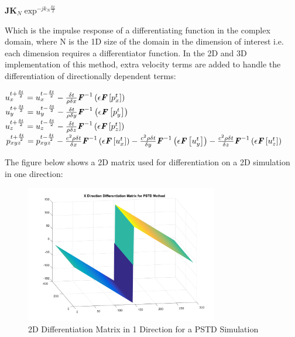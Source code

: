 \begin{center}
$\textbf{JK}_N \exp^{-jk_N\frac{\delta x}{2}}$\\
\end{center}
Which is the impulse response of a differentiating function in the complex domain, where N is the 1D size of the domain in the dimension of interest i.e. each dimension requires a differentiator function. In the 2D and 3D implementation of this method, extra velocity terms are added to handle the differentiation of directionally dependent terms:\\
\begin{center}
$u^{t + \frac{\delta t}{2}}_{x} = u^{t - \frac{\delta t}{2}}_{x} - \frac{\delta t}{\rho \delta x} \textbf{\textit{F}}^{-1}\left(\epsilon \textbf{\textit{F}}\left[p^{t}_{x}\right] \right)$\\
$u^{t + \frac{\delta t}{2}}_{y} = u^{t - \frac{\delta t}{2}}_{y} - \frac{\delta t}{\rho \delta y} \textbf{\textit{F}}^{-1}\left(\epsilon \textbf{\textit{F}}\left[p^{t}_{y}\right] \right)$\\
$u^{t + \frac{\delta t}{2}}_{z} = u^{t - \frac{\delta t}{2}}_{z} - \frac{\delta t}{\rho \delta z} \textbf{\textit{F}}^{-1}\left(\epsilon \textbf{\textit{F}}\left[p^{t}_{z}\right] \right)$\\
$p^{t + \frac{\delta t}{2}}_{xyz} = p^{t - \frac{\delta t}{2}}_{xyz} - \frac{c^2 \rho \delta t}{\delta x} \textbf{\textit{F}}^{-1}\left( \epsilon \textbf{\textit{F}} \left[ u_x^{t} \right] \right) - \frac{c^2 \rho \delta t}{\delta y} \textbf{\textit{F}}^{-1}\left( \epsilon \textbf{\textit{F}} \left[ u_y^{t} \right] \right) - \frac{c^2 \rho \delta t}{\delta z} \textbf{\textit{F}}^{-1}\left( \epsilon \textbf{\textit{F}} \left[ u_z^{t} \right] \right)$ \\
\end{center}
The figure below shows a 2D matrix used for differentiation on a 2D simulation in one direction:\\
\begin{figure}[H]
\centering
  \includegraphics[width=0.75\textwidth]{./graphics/pstd2ddiffmatrix.png}
  \caption{2D Differentiation Matrix in 1 Direction for a PSTD Simulation}
\end{figure}

